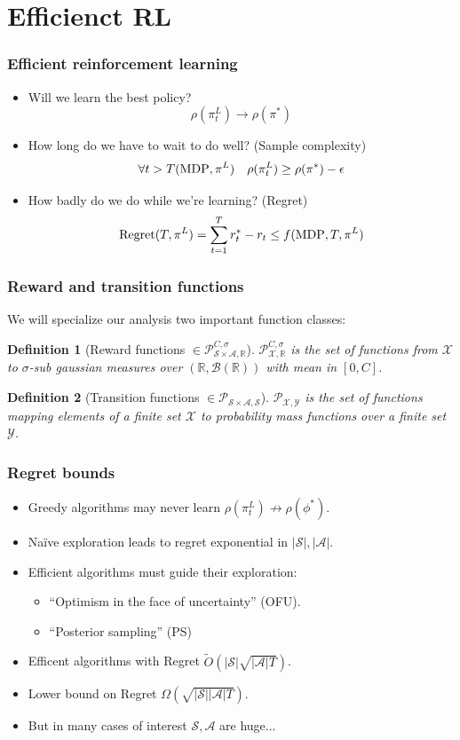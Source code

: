 \documentclass{beamer}
\newlength{\wideitemsep}
\let\olditem\item
\renewcommand{\item}{\setlength{\itemsep}{\wideitemsep}\olditem}
\newtheorem{mydef}{Definition}
\newcommand{\Real}{\mathds{R}}
\newcommand{\Xc}{\mathcal{X}}
\newcommand{\Yc}{\mathcal{Y}}
\newcommand{\Pc}{\mathcal{P}}
\newcommand{\Sc}{\mathcal{S}}
\newcommand{\Ac}{\mathcal{A}}
\begin{document}
\section{Efficienct RL}
\begin{frame}
\frametitle{Efficient reinforcement learning}

\begin{itemize}
	\item Will we learn the best policy?
	$$ \rho(\pi^L_t) \rightarrow \rho(\pi^*)$$ \pause
	\item How long do we have to wait to do well? (Sample complexity)
	$$ \forall t > T({\rm MDP},\pi^L) \ \ \ \rho(\pi^L_t) \ge \rho(\pi^*) -\epsilon $$ \pause
	\item How badly do we do while we're learning? (Regret)
	$$ {\rm Regret}(T,\pi^L) = \sum_{t=1}^T r^*_t - r_t \le f({\rm MDP},T,\pi^L) $$
\end{itemize}
\end{frame}

\begin{frame}
\frametitle{Reward and transition functions}
We will specialize our analysis two important function classes:

\begin{mydef}[Reward functions $\in \Pc^{C,\sigma}_{\Sc \times \Ac,\Real} $]
$\Pc^{C,\sigma}_{\Xc,\Real}$ is the set of functions from $\Xc$ to $\sigma$-sub gaussian measures over $(\Real,\mathcal{B}(\Real) )$ with mean in $[0,C]$.
\end{mydef}

\begin{mydef}[Transition functions $\in \Pc_{\Sc \times \Ac,\Sc}$]
$\Pc_{\Xc,\Yc}$ is the set of functions mapping elements of a finite set $\Xc$ to probability mass functions over a finite set $\Yc$.
\end{mydef}
\end{frame}

\begin{frame}
\frametitle{Regret bounds}
\begin{itemize}
	\item Greedy algorithms may never learn $\rho(\pi^L_t) \nrightarrow \rho(\phi^*)$.
	\item Na\"{i}ve exploration leads to regret exponential in $|\Sc|, |\Ac|$.
	\item Efficient algorithms must guide their exploration:
	\begin{itemize} \pause
		\item ``Optimism in the face of uncertainty'' (OFU).
		\item ``Posterior sampling'' (PS)
	\end{itemize}
	\pause \vspace{3mm}
	\item Efficent algorithms with Regret $\tilde{O}(|\Sc| \sqrt{|\Ac|T})$.
	\item Lower bound on Regret $\Omega(\sqrt{|\Sc| |\Ac| T})$.
	\item But in many cases of interest $\Sc, \Ac$ are huge... \pause \frownie
\end{itemize}
\end{frame}
\end{document}
